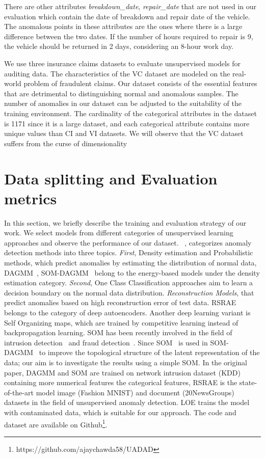 \documentclass{article}
\begin{document}
There are other attributes \textit{breakdown\_date}, \textit{repair\_date} that are not used in our evaluation which contain the date of breakdown and repair date of the vehicle. The anomalous points in these attributes are the ones where there is a large difference between the two dates. If the number of hours required to repair is 9, the vehicle should be returned in 2 days, considering an 8-hour work day. 

We use three insurance claims datasets to evaluate unsupervised models for auditing data. The characteristics of the VC dataset are modeled on the real-world problem of fraudulent claims. Our dataset consists of the essential features that are detrimental to distinguishing normal and anomalous samples. The number of anomalies in our dataset can be adjusted to the suitability of the training environment. The cardinality of the categorical attributes in the dataset is 1171 since it is a large dataset, and each categorical attribute contains more unique values than CI and VI datasets. We will observe that the VC dataset suffers from the curse of dimensionality

\section{Data splitting and Evaluation metrics}

In this section, we briefly describe the training and evaluation strategy of our work. We select models from different categories of unsupervised learning approaches and observe the performance of our dataset. ~\citep{ruff2021}, categorizes anomaly detection methods into three topics. \textit{First}, Density estimation and Probabilistic methods, which predict anomalies by estimating the distribution of normal data, DAGMM~\citep{dagmm}, SOM-DAGMM~\citep{som} belong to the energy-based models under the density estimation category. \textit{Second}, One Class Classification approaches aim to learn a decision boundary on the normal data distribution. \textit{Reconstruction Models}, that predict anomalies based on high reconstruction error of test data. RSRAE~\citep{rsrae} belongs to the category of deep autoencoders. Another deep learning variant is Self Organizing maps, which are trained by competitive learning instead of backpropagation learning. SOM has been recently involved in the field of intrusion detection~\citep{som, chen2021multi} and fraud detection~\citep{som1}. Since SOM~\citep{kohonen1990self} is used in SOM-DAGMM~\citep{som} to improve the topological structure of the latent representation of the data; our aim is to investigate the results using a simple SOM. In the original paper, DAGMM and SOM are trained on network intrusion dataset (KDD) containing more numerical features the categorical features, RSRAE is the state-of-the-art model image (Fashion MNIST) and document (20NewsGroups) datasets in the field of unsupervised anomaly detection. LOE trains the model with contaminated data, which is suitable for our approach. The code and dataset are available on Github\footnote[1]{https://github.com/ajaychawda58/UADAD}.
\end{document}
